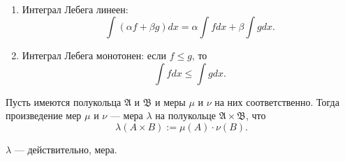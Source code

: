\documentclass[12pt,a4paper]{article}
\begin{document}
    \begin{lemma}\ 
        \begin{enumerate}
            \item Интеграл Лебега линеен:
                \[\int (\alpha f + \beta g) dx = \alpha \int f dx + \beta \int g dx.\]
            \item Интеграл Лебега монотонен: если $f \leqslant g$, то
                \[\int f dx \leqslant \int g dx.\]
        \end{enumerate}
    \end{lemma}

    \begin{definition}
        Пусть имеются полукольца $\mathfrak{A}$ и $\mathfrak{B}$ и меры $\mu$ и $\nu$ на них соответственно. Тогда произведение мер $\mu$ и $\nu$ --- мера $\lambda$ на полукольце $\mathfrak{A} \times \mathfrak{B}$, что
        \[\lambda(A \times B) := \mu(A) \cdot \nu(B).\]
    \end{definition}

    \begin{theorem}
        $\lambda$ --- действительно, мера.
    \end{theorem}
\end{document}
